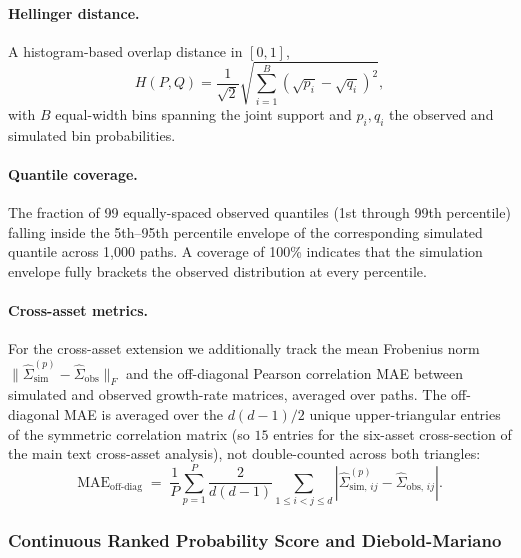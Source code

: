 \paragraph{Hellinger distance.}
A histogram-based overlap distance in $[0, 1]$,
\begin{equation}
    H(P, Q) = \frac{1}{\sqrt{2}}\sqrt{\sum_{i=1}^{B}\left(\sqrt{p_i} - \sqrt{q_i}\right)^2},
    \label{eq:hellinger}
\end{equation}
with $B$ equal-width bins spanning the joint support and $p_i, q_i$ the observed and simulated bin probabilities.

\paragraph{Quantile coverage.}
The fraction of 99 equally-spaced observed quantiles (1st through 99th percentile) falling inside the 5th--95th percentile envelope of the corresponding simulated quantile across 1{,}000 paths.
A coverage of 100\% indicates that the simulation envelope fully brackets the observed distribution at every percentile.

\paragraph{Cross-asset metrics.}
For the cross-asset extension we additionally track the mean Frobenius norm $\|\hat\Sigma_{\text{sim}}^{(p)} - \hat\Sigma_{\text{obs}}\|_F$ and the off-diagonal Pearson correlation MAE between simulated and observed growth-rate matrices, averaged over paths. The off-diagonal MAE is averaged over the $d(d-1)/2$ unique upper-triangular entries of the symmetric correlation matrix (so $15$ entries for the six-asset cross-section of the main text cross-asset analysis), not double-counted across both triangles:
\begin{equation*}
    \text{MAE}_{\text{off-diag}} \;=\; \frac{1}{P}\sum_{p=1}^{P} \frac{2}{d(d-1)} \sum_{1 \leq i < j \leq d} \left| \hat\Sigma^{(p)}_{\text{sim},\,ij} - \hat\Sigma_{\text{obs},\,ij} \right|.
\end{equation*}

\subsubsection{Continuous Ranked Probability Score and Diebold-Mariano}
\label{sec:crps_methods}

